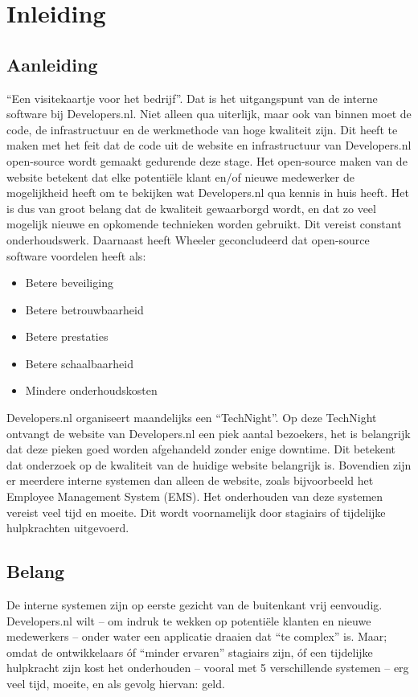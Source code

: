 \chapter{Inleiding}

\label{Chapter1}

\section{Aanleiding}
\enquote{Een visitekaartje voor het bedrijf}. Dat is het uitgangspunt van de interne software bij Developers.nl. Niet alleen qua uiterlijk, maar ook van binnen moet de code, de infrastructuur en de werkmethode van hoge kwaliteit zijn. Dit heeft te maken met het feit dat de code uit de website en infrastructuur van Developers.nl open-source wordt gemaakt gedurende deze stage. Het open-source maken van de website betekent dat elke potentiële klant en/of nieuwe medewerker de mogelijkheid heeft om te bekijken wat Developers.nl qua kennis in huis heeft. Het is dus van groot belang dat de kwaliteit gewaarborgd wordt, en dat zo veel mogelijk nieuwe en opkomende technieken worden gebruikt. Dit vereist constant onderhoudswerk. Daarnaast heeft Wheeler \parencite{WhyOpenSource} geconcludeerd dat open-source software voordelen heeft als:
\begin{itemize}
	\item Betere beveiliging
	\item Betere betrouwbaarheid 
	\item Betere prestaties
	\item Betere schaalbaarheid
	\item Mindere onderhoudskosten
\end{itemize}

Developers.nl organiseert maandelijks een \enquote{TechNight}. Op deze TechNight ontvangt de website van Developers.nl een piek aantal bezoekers, het is belangrijk dat deze pieken goed worden afgehandeld zonder enige downtime. Dit betekent dat onderzoek op de kwaliteit van de huidige website belangrijk is. Bovendien zijn er meerdere interne systemen dan alleen de website, zoals bijvoorbeeld het Employee Management System (EMS). Het onderhouden van deze systemen vereist veel tijd en moeite. Dit wordt voornamelijk door stagiairs of tijdelijke hulpkrachten uitgevoerd.

\section{Belang}
De interne systemen zijn op eerste gezicht van de buitenkant vrij eenvoudig. Developers.nl wilt -- om indruk te wekken op potentiële klanten en nieuwe medewerkers -- onder water een applicatie draaien dat \enquote{te complex} is. Maar; omdat de ontwikkelaars óf \enquote{minder ervaren} stagiairs zijn, óf een tijdelijke hulpkracht zijn kost het onderhouden -- vooral met 5 verschillende systemen -- erg veel tijd, moeite, en als gevolg hiervan: geld.

